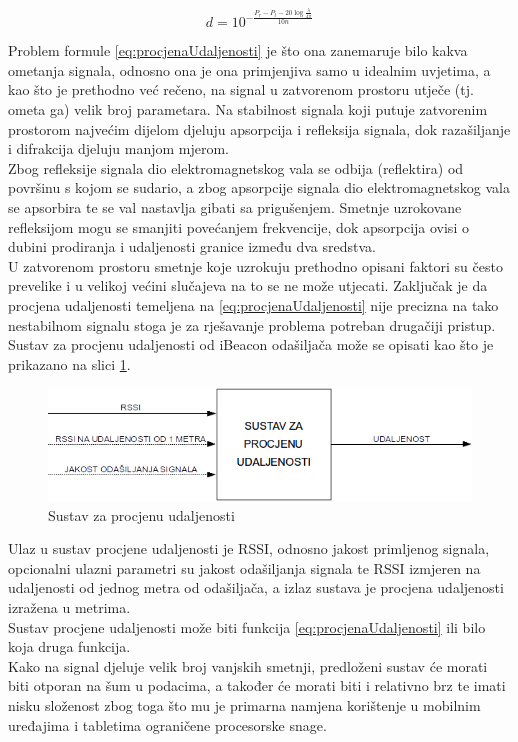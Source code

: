\begin{equation}
	\label{eq:procjenaUdaljenosti}
	d = 10^{-\frac{P_r - P_t - 20\log{\frac{\lambda}{4\pi}}}{10n}}
\end{equation}

Problem formule \eqref{eq:procjenaUdaljenosti} je što ona zanemaruje bilo kakva ometanja signala, odnosno ona je ona primjenjiva samo u idealnim uvjetima, a kao što je prethodno već rečeno, na signal u zatvorenom prostoru utječe (tj. ometa ga) velik broj parametara. 
Na stabilnost signala koji putuje zatvorenim prostorom najvećim dijelom djeluju apsorpcija i refleksija signala, dok razašiljanje i difrakcija djeluju manjom mjerom.
\\
Zbog refleksije signala dio elektromagnetskog vala se odbija (reflektira) od površinu s kojom se sudario, a zbog apsorpcije signala dio elektromagnetskog vala se apsorbira te se val nastavlja gibati sa prigušenjem. 
Smetnje uzrokovane refleksijom mogu se smanjiti povećanjem frekvencije, dok apsorpcija ovisi o dubini prodiranja i udaljenosti granice između dva sredstva. 
\\

U zatvorenom prostoru smetnje koje uzrokuju prethodno opisani faktori su često prevelike i u velikoj većini slučajeva na to se ne može utjecati. 
Zaključak je da procjena udaljenosti temeljena na \eqref{eq:procjenaUdaljenosti} nije precizna na tako nestabilnom signalu stoga je za rješavanje problema potreban drugačiji pristup.
\\

Sustav za procjenu udaljenosti od iBeacon odašiljača može se opisati kao što je prikazano na slici \ref{fig:sustavZaProcjenuUdaljenosti}.

\begin{figure}[H]
    \centering
    \includegraphics[scale=0.68]{pictures/sustav-za-procjenu-udaljenosti}
    \caption{Sustav za procjenu udaljenosti}
    \label{fig:sustavZaProcjenuUdaljenosti}
\end{figure}

Ulaz u sustav procjene udaljenosti je RSSI, odnosno jakost primljenog signala, opcionalni ulazni parametri su jakost odašiljanja signala te RSSI izmjeren na udaljenosti od jednog metra od odašiljača, a izlaz sustava je procjena udaljenosti izražena u metrima.
\\
Sustav procjene udaljenosti može biti funkcija \eqref{eq:procjenaUdaljenosti} ili bilo koja druga funkcija.
\\
Kako na signal djeluje velik broj vanjskih smetnji, predloženi sustav će morati biti otporan na šum u podacima, a također će morati biti i relativno brz te imati nisku složenost zbog toga što mu je primarna namjena korištenje u mobilnim uređajima i tabletima ograničene procesorske snage. 
\\

